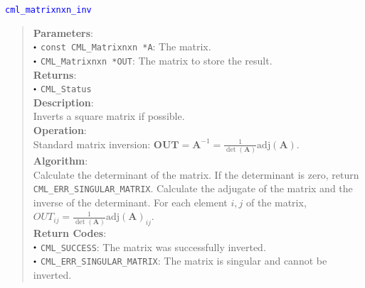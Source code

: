 \documentclass[a4paper,oneside,8pt]{extarticle}
\newcommand{\function}[1]{
  \noindent\textcolor{blue}{\texttt{#1}}
  \vspace{-0.3em}
}
\renewcommand{\dot}{\raisebox{0.3ex}{\scalebox{0.6}{$\bullet$}}}
\theoremstyle{definition}
\begin{document}
\function{cml\_matrixnxn\_inv}
\begin{quote}
  \textbf{Parameters}: \\
  $\dot$ \texttt{const CML\_Matrixnxn *A}: The matrix. \\
  $\dot$ \texttt{CML\_Matrixnxn *OUT}: The matrix to store the result. \\
  \textbf{Returns}: \\
  $\dot$ \texttt{CML\_Status} \\

  \vspace{-0.75em}
  \textbf{Description}: \\
  Inverts a square matrix if possible. \\

  \vspace{-0.75em}
  \textbf{Operation}: \\
  Standard matrix inversion: $\mathbf{OUT} = \mathbf{A}^{-1} = \frac{1}{\det(\mathbf{A})}\mathrm{adj}(\mathbf{A})$. \\

  \vspace{-0.75em}
  \textbf{Algorithm}: \\
  Calculate the determinant of the matrix. If the determinant is zero, return \texttt{CML\_ERR\_SINGULAR\_MATRIX}. Calculate the adjugate of the matrix and the inverse of the determinant. For each element $i, j$ of the matrix, $OUT_{ij} = \frac{1}{\det(\mathbf{A})}\mathrm{adj}(\mathbf{A})_{ij}$. \\

  \vspace{-0.75em}
  \textbf{Return Codes}: \\
  $\dot$ \texttt{CML\_SUCCESS}: The matrix was successfully inverted. \\
  $\dot$ \texttt{CML\_ERR\_SINGULAR\_MATRIX}: The matrix is singular and cannot be inverted. \\
\end{quote}
\end{document}

